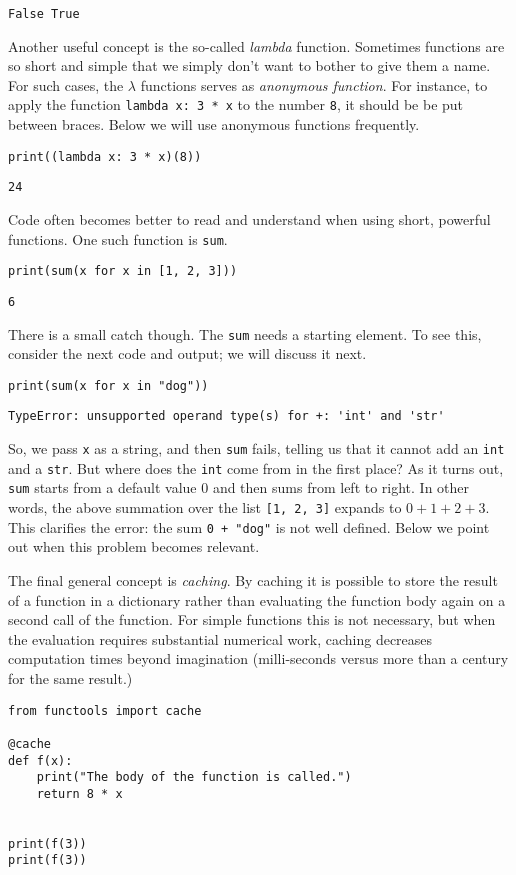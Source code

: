 \documentclass[stochastic-or]{subfiles}
\begin{document}
\begin{verbatim}
False True
\end{verbatim}

Another useful concept is the so-called \emph{lambda} function.
Sometimes functions are so short and simple that we simply don't want to bother to give them a name.
For such cases, the \(\lambda\) functions serves as \emph{anonymous function}.
For instance, to apply the function \texttt{lambda x: 3 * x} to the number \texttt{8}, it should be be put between braces.
Below we will use anonymous functions frequently.
\begin{verbatim}
print((lambda x: 3 * x)(8))
\end{verbatim}

\begin{verbatim}
24
\end{verbatim}

Code often becomes better to read and understand when using short, powerful functions. One such function is \texttt{sum}.
\begin{verbatim}
print(sum(x for x in [1, 2, 3]))
\end{verbatim}

\begin{verbatim}
6
\end{verbatim}

There is a small catch though.
The \texttt{sum} needs a starting element.
To see this, consider the next code and output; we will discuss it next.
\begin{verbatim}
print(sum(x for x in "dog"))
\end{verbatim}

\begin{verbatim}
TypeError: unsupported operand type(s) for +: 'int' and 'str'
\end{verbatim}

So, we pass \texttt{x} as a string, and then \texttt{sum} fails, telling us that it cannot add an \texttt{int} and a \texttt{str}.
But where does the \texttt{int} come from in the first place?
As it turns out, \texttt{sum} starts from a default value \(0\) and then sums from left to right.
In other words, the above summation over the list \texttt{[1, 2, 3]} expands to \(0 + 1 + 2 + 3\).
This clarifies the error:  the sum \texttt{0 + "dog"} is not well defined.
Below we point out when this problem becomes relevant.

The final general concept is \emph{caching}.
By caching it is possible to store the result of a function in a dictionary rather than evaluating the function body again on a second call of the function.
For simple functions this is not necessary, but when the evaluation requires substantial numerical work, caching decreases computation times beyond imagination (milli-seconds versus more than a century for the same result.)
\begin{verbatim}
from functools import cache

@cache
def f(x):
    print("The body of the function is called.")
    return 8 * x


print(f(3))
print(f(3))
\end{verbatim}
\end{document}
